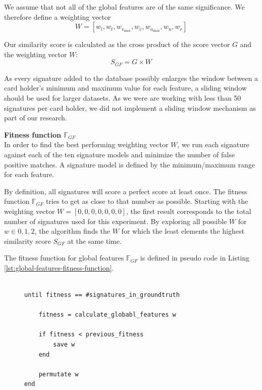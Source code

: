 \documentclass[a4paper, oneside]{csthesis}
\begin{document}
We assume that not all of the global features are of the same significance. We therefore define a  weighting vector $$W = [w_l, w_t, w_{v_\text{max}}, w_{\bar{v}}, w_{a_\text{max}}, w_n, w_r]$$

Our similarity score is calculated as the cross product of the score vector $G$ and the weighting vector $W$:
$$S_{GF} = G \times W$$

As every signature added to the database possibly enlarges the window between a card holder's minimum and maximum value for each feature, a sliding window should be used for larger datasets. As we were are working with less than 50 signatures per card holder, we did not implement a sliding window mechanism as part of our research.

\textbf{Fitness function $\mathbb{F}_{GF}$}\\
In order to find the best performing weighting vector $W$, we run each signature against each of the ten signature models and minimize the number of false positive matches. A signature model is defined by the minimum/maximum range for each feature.

By definition, all signatures will score a perfect score at least once. The fitness function $\mathbb{F}_{GF}$ tries to get as close to that number as possible. Starting with the weighting vector $W = [0, 0, 0, 0, 0, 0, 0]$, the first result corresponds to the total number of signatures used for this experiment. By exploring all possible $W$ for $w \in {0,1,2}$, the algorithm finds the $W$ for which the least elements the highest similarity score  $S_{GF}$ at the same time.

The fitness function for global features $\mathbb{F}_{GF}$ is defined in pseudo code in Listing \ref{lst:global-features-fitness-function}.

\begin{figure}
\begin{lstlisting}[caption={The fitness function for global features tries to reduce the number of signatures with the hightes possible score for a given weighting vector $W$},label={lst:global-features-fitness-function}]

until fitness == #signatures_in_groundtruth

    fitness = calculate_globabl_features w

    if fitness < previous_fitness
        save w
    end

    permutate w
end
\end{lstlisting}
\end{figure}
\end{document}
